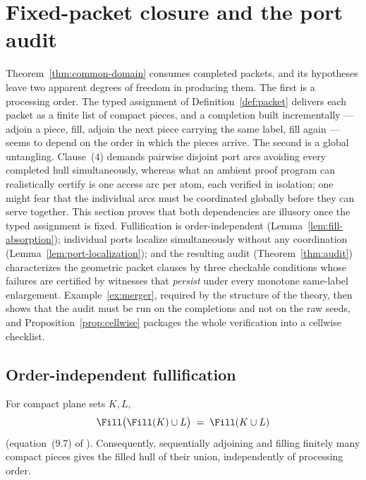 
\section{Fixed-packet closure and the port audit}\label{sec:audit}

Theorem~\ref{thm:common-domain} consumes completed packets, and its hypotheses leave
two apparent degrees of freedom in producing them. The first is a processing order.
The typed assignment of Definition~\ref{def:packet} delivers each packet as a finite
list of compact pieces, and a completion built incrementally --- adjoin a piece, fill,
adjoin the next piece carrying the same label, fill again --- seems to depend on the
order in which the pieces arrive. The second is a global untangling. Clause~(4)
demands pairwise disjoint port arcs avoiding every completed hull simultaneously,
whereas what an ambient proof program can realistically certify is one access arc per
atom, each verified in isolation; one might fear that the individual arcs must be
coordinated globally before they can serve together. This section proves that both
dependencies are illusory once the typed assignment is fixed. Fullification is
order-independent (Lemma~\ref{lem:fill-absorption}); individual ports localize
simultaneously without any coordination (Lemma~\ref{lem:port-localization}); and the
resulting audit (Theorem~\ref{thm:audit}) characterizes the geometric packet clauses
by three checkable conditions whose failures are certified by witnesses that
\emph{persist} under every monotone same-label enlargement.
Example~\ref{ex:merger}, required by the structure of the theory, then shows that the
audit must be run on the completions and not on the raw seeds, and
Proposition~\ref{prop:cellwise} packages the whole verification into a cellwise
checklist.

\subsection{Order-independent fullification}\label{subsec:E-fill-algebra}

\begin{lemma}\label{lem:fill-absorption}
For compact plane sets $K,L$,
\begin{equation}\label{eq:E-absorption}
\Fill\bigl(\Fill(K)\cup L\bigr)\;=\;\Fill(K\cup L)
\end{equation}
(equation~(9.7) of \cite{MWman}). Consequently, sequentially adjoining and filling
finitely many compact pieces gives the filled hull of their union, independently of
processing order.
\end{lemma}

